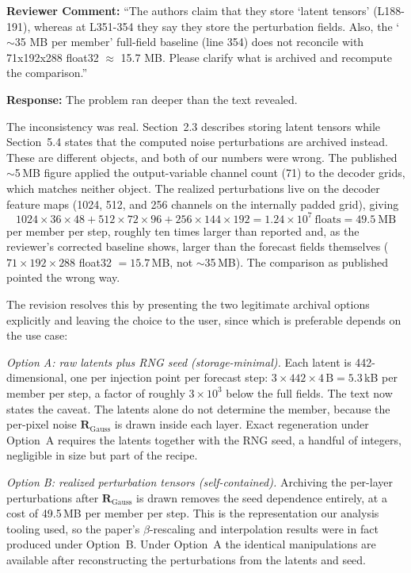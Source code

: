 \documentclass[12pt]{article}
\begin{document}
\textbf{Reviewer Comment:} ``The authors claim that they store `latent tensors'
(L188-191), whereas at L351-354 they say they store the perturbation fields. Also,
the `$\sim$35 MB per member' full-field baseline (line 354) does not reconcile with
71x192x288 float32 $\approx$ 15.7 MB. Please clarify what is archived and recompute
the comparison.''

\textbf{Response:} The problem ran deeper than the text revealed.

The inconsistency was real. Section~2.3 describes storing latent tensors while
Section~5.4 states that the computed noise perturbations are archived instead. These
are different objects, and both of our numbers were wrong. The published
$\sim$5\,MB figure applied the output-variable channel count (71) to the decoder
grids, which matches neither object. The realized perturbations live on the decoder
feature maps (1024, 512, and 256 channels on the internally padded grid), giving
\[
  1024{\times}36{\times}48 + 512{\times}72{\times}96 + 256{\times}144{\times}192
  = 1.24\times10^{7}\ \text{floats} = 49.5\ \mathrm{MB}
\]
per member per step, roughly ten times larger than reported and, as the reviewer's
corrected baseline shows, larger than the forecast fields themselves
($71{\times}192{\times}288$ float32 $=15.7$\,MB, not $\sim$35\,MB). The comparison as
published pointed the wrong way.

The revision resolves this by presenting the two legitimate archival options
explicitly and leaving the choice to the user, since which is preferable depends on
the use case:

\emph{Option A: raw latents plus RNG seed (storage-minimal).} Each latent is
442-dimensional, one per injection point per forecast step:
$3\times442\times4\,\mathrm{B}=5.3$\,kB per member per step, a factor of roughly
$3\times10^{3}$ below the full fields. The text now states the caveat. The latents alone do
not determine the member, because the per-pixel noise $\mathbf{R}_{\text{Gauss}}$ is
drawn inside each layer. Exact regeneration under Option~A requires the latents
together with the RNG seed, a handful of integers, negligible in size but part of
the recipe.

\emph{Option B: realized perturbation tensors (self-contained).} Archiving the
per-layer perturbations after $\mathbf{R}_{\text{Gauss}}$ is drawn removes the seed
dependence entirely, at a cost of 49.5\,MB per member per step. This is the
representation our analysis tooling used, so the paper's $\beta$-rescaling and
interpolation results were in fact produced under Option~B. Under Option~A the
identical manipulations are available after reconstructing the perturbations from
the latents and seed.
\end{document}
